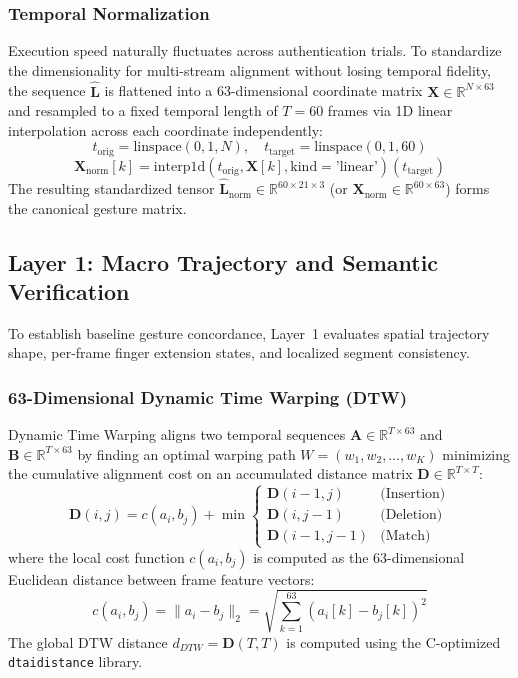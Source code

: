 \documentclass[conference]{IEEEtran}
\begin{document}
\subsubsection{Temporal Normalization}
Execution speed naturally fluctuates across authentication trials. To standardize the dimensionality for multi-stream alignment without losing temporal fidelity, the sequence $\hat{\mathbf{L}}$ is flattened into a 63-dimensional coordinate matrix $\mathbf{X} \in \mathbb{R}^{N \times 63}$ and resampled to a fixed temporal length of $T = 60$ frames via 1D linear interpolation across each coordinate independently:
\begin{equation}
t_{\text{orig}} = \text{linspace}(0, 1, N), \quad t_{\text{target}} = \text{linspace}(0, 1, 60)
\end{equation}
\begin{equation}
\mathbf{X}_{\text{norm}}[k] = \text{interp1d}(t_{\text{orig}}, \mathbf{X}[k], \text{kind}=\text{'linear'})(t_{\text{target}})
\label{eq:temporal_norm}
\end{equation}
The resulting standardized tensor $\hat{\mathbf{L}}_{\text{norm}} \in \mathbb{R}^{60 \times 21 \times 3}$ (or $\mathbf{X}_{\text{norm}} \in \mathbb{R}^{60 \times 63}$) forms the canonical gesture matrix.

\subsection{Layer 1: Macro Trajectory and Semantic Verification}

To establish baseline gesture concordance, Layer~1 evaluates spatial trajectory shape, per-frame finger extension states, and localized segment consistency.

\subsubsection{63-Dimensional Dynamic Time Warping (DTW)}
Dynamic Time Warping aligns two temporal sequences $\mathbf{A} \in \mathbb{R}^{T \times 63}$ and $\mathbf{B} \in \mathbb{R}^{T \times 63}$ by finding an optimal warping path $W = (w_1, w_2, \ldots, w_K)$ minimizing the cumulative alignment cost on an accumulated distance matrix $\mathbf{D} \in \mathbb{R}^{T \times T}$:
\begin{equation}
\mathbf{D}(i, j) = c(a_i, b_j) + \min \begin{cases}
\mathbf{D}(i-1, j) & \text{(Insertion)} \\
\mathbf{D}(i, j-1) & \text{(Deletion)} \\
\mathbf{D}(i-1, j-1) & \text{(Match)}
\end{cases}
\end{equation}
where the local cost function $c(a_i, b_j)$ is computed as the 63-dimensional Euclidean distance between frame feature vectors:
\begin{equation}
c(a_i, b_j) = \|a_i - b_j\|_2 = \sqrt{\sum_{k=1}^{63} (a_i[k] - b_j[k])^2}
\end{equation}
The global DTW distance $d_{DTW} = \mathbf{D}(T, T)$ is computed using the C-optimized \texttt{dtaidistance} library.
\end{document}
